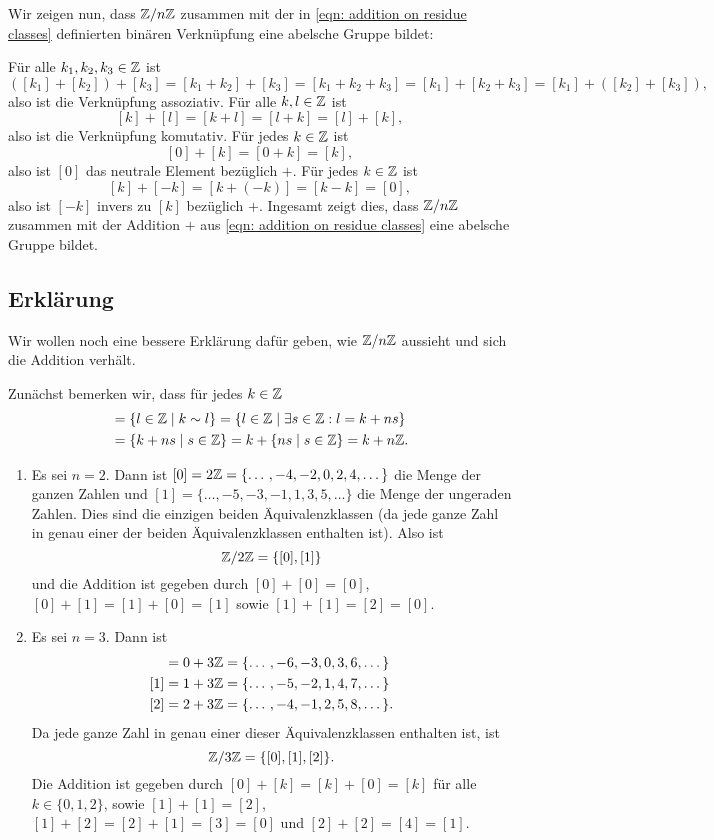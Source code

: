 Wir zeigen nun, dass $\mathbb{Z}/n\mathbb{Z}$ zusammen mit der in \eqref{eqn: addition on residue classes} definierten binären Verknüpfung eine abelsche Gruppe bildet:

Für alle $k_1, k_2, k_3 \in \mathbb{Z}$ ist
\[
 ([k_1] + [k_2]) + [k_3]
 = [k_1 + k_2] + [k_3]
 = [k_1 + k_2 + k_3]
 = [k_1] + [k_2 + k_3]
 = [k_1] + ([k_2] + [k_3]),
\]
also ist die Verknüpfung assoziativ. Für alle $k,l \in \mathbb{Z}$ ist
\[
 [k] + [l] = [k+l] = [l+k] = [l] + [k],
\]
also ist die Verknüpfung komutativ. Für jedes $k \in \mathbb{Z}$ ist
\[
 [0] + [k] = [0 + k] = [k],
\]
also ist $[0]$ das neutrale Element bezüglich $+$. Für jedes $k \in \mathbb{Z}$ ist
\[
 [k] + [-k] = [k+(-k)] = [k-k] = [0],
\]
also ist $[-k]$ invers zu $[k]$ bezüglich $+$. Ingesamt zeigt dies, dass $\mathbb{Z}/n\mathbb{Z}$ zusammen mit der Addition $+$ aus \eqref{eqn: addition on residue classes} eine abelsche Gruppe bildet.



\subsection{Erklärung}
Wir wollen noch eine bessere Erklärung dafür geben, wie $\mathbb{Z}/n\mathbb{Z}$ aussieht und sich die Addition verhält.

Zunächst bemerken wir, dass für jedes $k \in \mathbb{Z}$
\begin{align*}
 [k]
 &= \{l \in \Zbb \mid k \sim l\}
 = \{l \in \Zbb \mid \exists s \in \Zbb : l = k + ns\} \\
 &= \{k + ns \mid s \in \Zbb\}
 = k + \{ns \mid s \in \Zbb\}
 = k + n\Zbb.
\end{align*}

\begin{bsp}
 \begin{enumerate}[label=\alph*),leftmargin=*]
  \item
   Es sei $n = 2$. Dann ist $[0] = 2\mathbb{Z} = \{\dotso, -4, -2, 0, 2, 4, \dotso\}$ die Menge der ganzen Zahlen und $[1] = \{\dotso, -5, -3, -1, 1, 3, 5, \dotso\}$ die Menge der ungeraden Zahlen. Dies sind die einzigen beiden Äquivalenzklassen (da jede ganze Zahl in genau einer der beiden Äquivalenzklassen enthalten ist). Also ist
   \[
    \mathbb{Z}/2\mathbb{Z} = \{[0], [1]\}
   \]
   und die Addition ist gegeben durch $[0] + [0] = [0]$, $[0] + [1] = [1] + [0] = [1]$ sowie $[1] + [1] = [2] = [0]$.
   
  \item
   Es sei $n = 3$. Dann ist
   \begin{align*}
    [0] &= 0+3\Zbb = \{\dotso, -6, -3, 0, 3, 6, \dotso\} \\
    [1] &= 1+3\Zbb = \{\dotso, -5, -2, 1, 4, 7, \dotso\} \\
    [2] &= 2+3\Zbb = \{\dotso, -4, -1, 2, 5, 8, \dotso\}.
   \end{align*}
   Da jede ganze Zahl in genau einer dieser Äquivalenzklassen enthalten ist, ist
   \[
    \mathbb{Z}/3\mathbb{Z} = \{[0], [1], [2]\}.
   \]
   Die Addition ist gegeben durch $[0] + [k] = [k] + [0] = [k]$ für alle $k \in \{0,1,2\}$, sowie $[1]+[1] = [2]$, $[1]+[2] = [2]+[1] = [3] = [0]$ und $[2]+[2] = [4] = [1]$.
 \end{enumerate}
\end{bsp}

